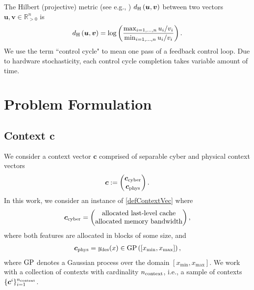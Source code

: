 \documentclass[letterpaper, 10pt, twocolumn]{ieeeconf}      %
\begin{document}
The Hilbert (projective) metric (see e.g., \cite{bushell1973hilbert}) $d_{\rm{H}}\left(\bm{u},\bm{v}\right)$ between two vectors $\bm{u},\bm{v}\in\mathbb{R}^{n}_{>0}$ is
\begin{align}
d_{\rm{H}}\left(\bm{u},\bm{v}\right) = \log\left(\dfrac{\max_{i=1,\hdots,n}u_i/v_i}{\min_{i=1,\hdots,n}u_i/v_i}\right).
\label{HilbertMetric}
\end{align}
We use the term ``control cycle" to mean one pass of a feedback control loop. Due to hardware stochasticity, each control cycle completion takes variable amount of time.




\section{Problem Formulation}\label{sec:formulation}
\subsection{Context $\bm{c}$}\label{subsec:Contextc}
\noindent 
We consider a context vector $\bm{c}$ comprised of separable cyber and physical context vectors
\begin{align}
\bm{c} := \begin{pmatrix}
\bm{c}_{\rm{cyber}}\\
\bm{c}_{\rm{phys}}
\end{pmatrix}.
\label{defContextVec} 
\end{align}
In this work, we consider an instance of \eqref{defContextVec} where 
\begin{align}
\bm{c}_{\rm{cyber}} = \begin{pmatrix}
{\text{allocated last-level cache}}\\
{\text{allocated memory bandwidth}}
\end{pmatrix},
\label{defcCyber}
\end{align}
where both features are allocated in blocks of some size, and
\begin{align}
\bm{c}_{\rm{phys}} = y_{\rm{des}}(x)\in {\rm{GP}}\left([x_{\min},x_{\max}]\right),
\label{defcPhysical}
\end{align}
where ${\rm{GP}}$ denotes a Gaussian process over the domain $[x_{\min},x_{\max}]$. We work with a collection of contexts with cardinality $n_{\rm{context}}$, i.e., a sample of contexts $\{\bm{c}^{i}\}_{i=1}^{n_{\rm{context}}}$. 
\end{document}
